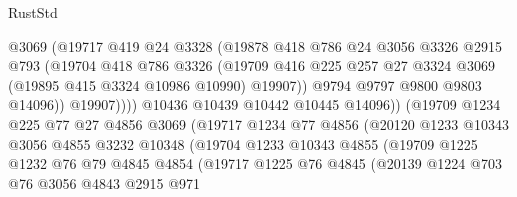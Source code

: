 \begin{lexlean}{RustStd}
\begin{coremodule}
                            @3069
                            (@19717
                              @419
                              @24
                              @3328
                              (@19878
                                @418
                                @786
                                @24
                                @3056
                                @3326
                                @2915
                                @793
                                (@19704
                                  @418
                                  @786
                                  @3326
                                  (@19709
                                    @416
                                    @225
                                    @257
                                    @27
                                    @3324
                                    @3069
                                    (@19895 @415 @3324 @10986 @10990)
                                    @19907))
                                @9794
                                @9797
                                @9800
                                @9803
                                @14096))
                            @19907))))
                    @10436
                    @10439
                    @10442
                    @10445
                    @14096))
                (@19709
                  @1234
                  @225
                  @77
                  @27
                  @4856
                  @3069
                  (@19717
                    @1234
                    @77
                    @4856
                    (@20120
                      @1233
                      @10343
                      @3056
                      @4855
                      @3232
                      @10348
                      (@19704
                        @1233
                        @10343
                        @4855
                        (@19709
                          @1225
                          @1232
                          @76
                          @79
                          @4845
                          @4854
                          (@19717
                            @1225
                            @76
                            @4845
                            (@20139
                              @1224
                              @703
                              @76
                              @3056
                              @4843
                              @2915
                              @971

\end{coremodule}
\end{lexlean}
